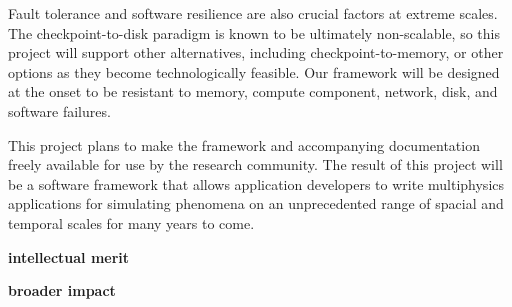 \documentclass[11pt,letterpaper]{article}
\begin{document}
Fault tolerance and software resilience are also crucial factors at
extreme scales.  The checkpoint-to-disk paradigm is known to be
ultimately non-scalable, so this project will support other alternatives,
including checkpoint-to-memory, or other options as they become
technologically feasible.  Our framework will be designed at the onset
to be resistant to memory, compute component, network, disk, and
software failures.

This project plans to make the framework and accompanying documentation freely
available for use by the research community.  The result of this
project will be a software framework that allows application
developers to write multiphysics applications for simulating phenomena
on an unprecedented range of spacial and temporal scales for many
years to come.

\textbf{intellectual merit}

\textbf{broader impact}
\end{document}
